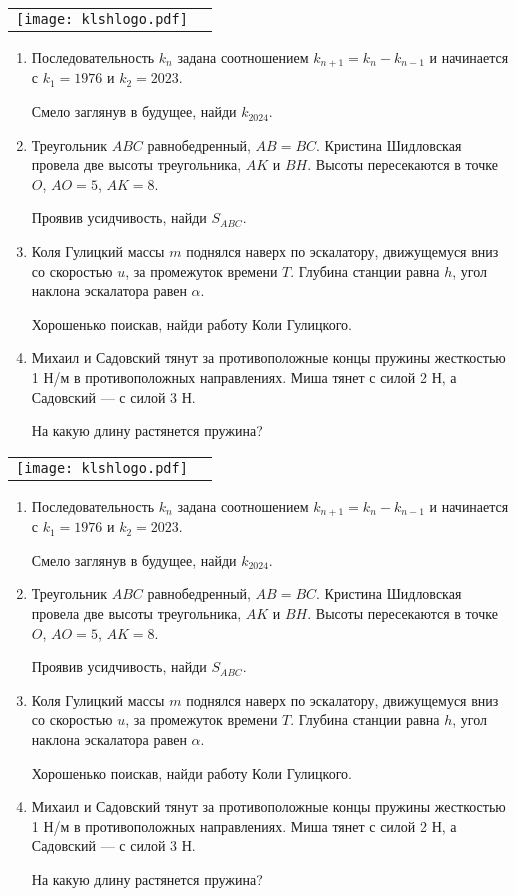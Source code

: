 \documentclass[11pt]{article} %
\newcommand{\tourname}{Финал ФМТ}
\newcommand{\putlogo}{
\begin{center}
\begin{tabular}{cc}
\texttt{[image: klshlogo.pdf]} &
\raisebox{1cm}{
    {\Large\bf \tourname}
}
\end{tabular}
\end{center}
}
\newcommand{\easymath}{
Последовательность $k_n$ задана соотношением $k_{n+1} = k_n - k_{n-1}$ и начинается с $k_1 = 1976$ и $k_2 = 2023$.

Смело заглянув в будущее, найди $k_{2024}$.
}
\newcommand{\veryhardmath}{
Треугольник $ABC$ равнобедренный, $AB=BC$. 
Кристина Шидловская провела две высоты треугольника, $AK$ и $BH$. 
Высоты пересекаются в точке $O$, $AO = 5$, $AK = 8$.

Проявив усидчивость, найди $S_{ABC}$.
}
\newcommand{\hardphys}{
Коля Гулицкий массы $m$ поднялся наверх по эскалатору, движущемуся вниз со скоростью $u$, 
за промежуток времени $T$. 
Глубина станции равна $h$, угол наклона эскалатора равен $\alpha$.

Хорошенько поискав, найди работу Коли Гулицкого. 
}
\newcommand{\veryhardphys}{
    Михаил и Садовский тянут за противоположные концы пружины жесткостью 1 Н/м в противоположных направлениях. 
    Миша тянет с силой 2 Н, а Садовский — с силой 3 Н. 
    
    На какую длину растянется пружина?
}
\begin{document}
\topjudge
\newpage %
\topjudge




\newpage %

\putlogo

\begin{enumerate}
    \item \easymath
    \item \veryhardmath
    \item \hardphys
    \item \veryhardphys
\end{enumerate}

\vfill

\putlogo

\begin{enumerate}
    \item \easymath
    \item \veryhardmath
    \item \hardphys
    \item \veryhardphys
\end{enumerate}
\end{document}
